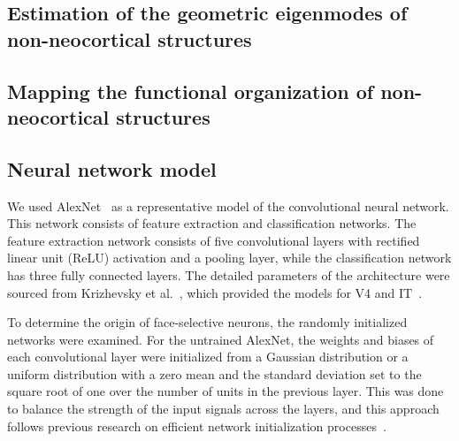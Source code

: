 \documentclass[sn-mathphys-num]{sn-jnl}%
\theoremstyle{thmstyleone}%
\theoremstyle{thmstyletwo}%
\theoremstyle{thmstylethree}%
\begin{document}
\subsection{Estimation of the geometric eigenmodes of non-neocortical structures} \label{sec:geometric_estimation}


\subsection{Mapping the functional organization of non-neocortical structures} \label{sec:functional_mapping}


\subsection{Neural network model} \label{sec:nn}
We used AlexNet~\cite{krizhevsky2012imagenet} as a representative model of the convolutional neural network.
This network consists of feature extraction and classification networks.
The feature extraction network consists of five convolutional layers with rectified linear unit (ReLU) activation and a pooling layer, while the classification network has three fully connected layers.
The detailed parameters of the architecture were sourced from Krizhevsky et al.~\cite{krizhevsky2012imagenet}, which provided the models for V4 and IT~\cite{cadieu2014deep}.


To determine the origin of face-selective neurons, the randomly initialized networks were examined.
For the untrained AlexNet, the weights and biases of each convolutional layer were initialized from a Gaussian distribution or a uniform distribution with a zero mean and the standard deviation set to the square root of one over the number of units in the previous layer.
This was done to balance the strength of the input signals across the layers, 
and this approach follows previous research on efficient network initialization processes~\cite{lecun2002efficient}.
\end{document}
